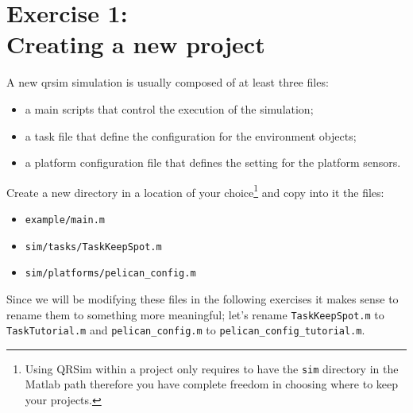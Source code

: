 \documentclass[a4paper,11pt]{article}
\begin{document}
\section*{Exercise 1:\\Creating a new project}

A new qrsim simulation is usually composed of at least three files:
\begin{itemize}
 \item a main scripts that control the execution of the simulation;
 \item a task file that define the configuration for the environment objects;
 \item a platform configuration file that defines the setting for the platform sensors.
\end{itemize}
Create a new directory in a location of your choice\footnote{Using QRSim within a project only requires to have the \texttt{sim} directory in the Matlab path therefore you have complete freedom in choosing where to keep your projects.} and copy into it the files:
\begin{itemize}
 \item \texttt{example/main.m}
 \item \texttt{sim/tasks/TaskKeepSpot.m}
 \item \texttt{sim/platforms/pelican\_config.m}
\end{itemize}
Since we will be modifying these files in the following exercises it makes sense to rename them to something more meaningful; let's rename \texttt{TaskKeepSpot.m} to \texttt{TaskTutorial.m} and \texttt{pelican\_config.m} to \texttt{pelican\_config\_tutorial.m}.
\end{document}

